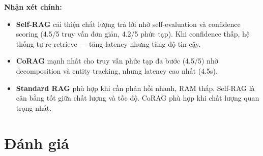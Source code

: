 \documentclass[10pt, conference, a4paper, compsocconf]{IEEEtran}
\begin{document}
\begin{table}[t]
\renewcommand{\arraystretch}{1.15}
\caption{So sánh ba chiến lược: Standard RAG vs Self-RAG vs CoRAG}
\label{tab:rag-compare}
\centering
{}
\end{table}

\textbf{Nhận xét chính:}
\begin{itemize}
\item \textbf{Self-RAG} cải thiện chất lượng trả lời nhờ self-evaluation và confidence scoring (4.5/5 truy vấn đơn giản, 4.2/5 phức tạp). Khi confidence thấp, hệ thống tự re-retrieve --- tăng latency nhưng tăng độ tin cậy.
\item \textbf{CoRAG} mạnh nhất cho truy vấn phức tạp đa bước (4.5/5) nhờ decomposition và entity tracking, nhưng latency cao nhất (4.5s).
\item \textbf{Standard RAG} phù hợp khi cần phản hồi nhanh, RAM thấp. Self-RAG là cân bằng tốt giữa chất lượng và tốc độ. CoRAG phù hợp khi chất lượng quan trọng nhất.
\end{itemize}

\section{Đánh giá}
\end{document}
